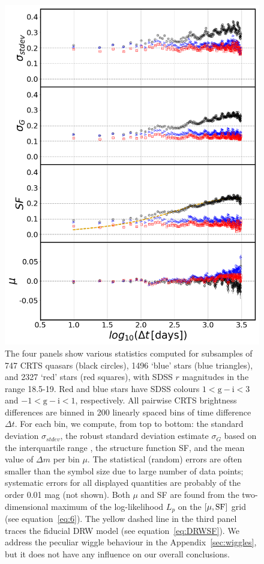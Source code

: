\documentclass[fleqn,usenatbib]{mnras}
\begin{document}
\begin{figure}
\includegraphics[width=1.05\columnwidth, center]{Fig_2.png}
\vskip -0.15in
\caption{The four panels show various statistics computed for subsamples of 747 CRTS quasars (black circles), 
1496 `blue' stars (blue triangles), and 2327 `red' stars (red squares), with SDSS $r$ magnitudes in the range 18.5-19.
 Red and blue stars have SDSS colours $1 < \mathrm{g-i} < 3$ and  $-1 < \mathrm{g-i} < 1$, respectively. All pairwise CRTS brightness 
differences are binned in 200 linearly spaced bins of time difference $\Delta t$. For each bin, we compute,
from top to bottom: the standard deviation $\sigma_{stdev}$, the robust standard deviation estimate $\sigma_{G}$ based on 
the interquartile range , the structure function SF, and the mean value of $\Delta m$ per bin $\mu$. The statistical
(random) errors are often smaller than the symbol size due to large number of data points; systematic errors for
all displayed quantities are probably of the order 0.01 mag (not shown). Both $\mu$ and SF are found from the 
two-dimensional maximum of the log-likelihood $L_{p}$ on the $[\mu,\rm{SF}]$ grid (see equation~\ref{eq:6}).  
The yellow dashed line in the third panel traces the fiducial DRW model (see equation~\ref{eq:DRWSF}). We address the peculiar wiggle behaviour in the Appendix~\ref{sec:wiggles}, but it does not have any influence on our overall conclusions. }
\label{fig:2}
\end{figure}
\end{document}
